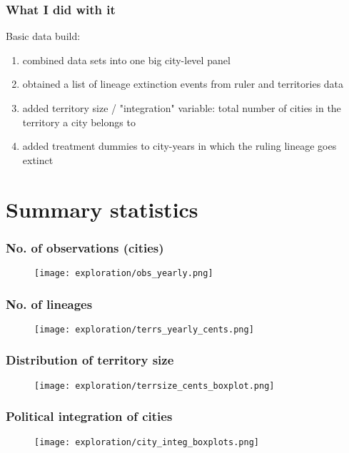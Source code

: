 \documentclass{beamer}
\begin{document}
\begin{frame}
\frametitle{What I did with it}
Basic data build:
\begin{enumerate}
    \item combined data sets into one big city-level panel
    \item obtained a list of lineage extinction events from ruler and territories data
    \item added territory size / "integration" variable: total number of cities in the territory a city belongs to
    \item added treatment dummies to city-years in which the ruling lineage goes extinct
\end{enumerate}
\end{frame}

\section{Summary statistics}

\begin{frame}
\frametitle{No. of observations (cities)}
\begin{figure}
    \centering
    \texttt{[image: exploration/obs\_yearly.png]}
    \label{fig:obs_yearly}
\end{figure}
\end{frame}

\begin{frame}
\frametitle{No. of lineages}
\begin{figure}
    \centering
    \texttt{[image: exploration/terrs\_yearly\_cents.png]}
    \label{fig:terrs_yearly_cents}
\end{figure}
\end{frame}

\begin{frame}
\frametitle{Distribution of territory size}
\begin{figure}
    \centering
    \texttt{[image: exploration/terrsize\_cents\_boxplot.png]}
    \label{fig:terrsize_boxplot}
\end{figure}
\end{frame}

\begin{frame}
\frametitle{Political integration of cities}
\begin{figure}
    \centering
    \texttt{[image: exploration/city\_integ\_boxplots.png]}
    \label{fig:city_integ}
\end{figure}
\end{frame}
\end{document}
